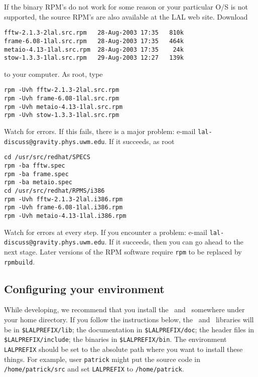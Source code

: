 If the binary RPM's do not work for some reason or your particular O/S
is not supported,   the source RPM's are also available at the LAL web
site.   Download
\begin{verbatim}
fftw-2.1.3-2lal.src.rpm   28-Aug-2003 17:35   810k  
frame-6.08-1lal.src.rpm   28-Aug-2003 17:35   464k  
metaio-4.13-1lal.src.rpm  28-Aug-2003 17:35    24k  
stow-1.3.3-1lal.src.rpm   29-Aug-2003 12:27   139k 
\end{verbatim}
to your computer.  As root,   type
\begin{verbatim}
rpm -Uvh fftw-2.1.3-2lal.src.rpm
rpm -Uvh frame-6.08-1lal.src.rpm
rpm -Uvh metaio-4.13-1lal.src.rpm
rpm -Uvh stow-1.3.3-1lal.src.rpm
\end{verbatim}
Watch for errors.  If this fails,  there is a major problem:  e-mail
\verb+lal-discuss@gravity.phys.uwm.edu+.    If it succeeds,  as root
\begin{verbatim}
cd /usr/src/redhat/SPECS
rpm -ba fftw.spec
rpm -ba frame.spec
rpm -ba metaio.spec
cd /usr/src/redhat/RPMS/i386
rpm -Uvh fftw-2.1.3-2lal.i386.rpm
rpm -Uvh frame-6.08-1lal.i386.rpm
rpm -Uvh metaio-4.13-1lal.i386.rpm
\end{verbatim}
Watch for errors at every step.  If you encounter a problem:   e-mail
\verb+lal-discuss@gravity.phys.uwm.edu+.   If it succeeds,  then you
can go ahead to the next stage.   Later versions of the RPM software
require \verb+rpm+ to be replaced by \verb+rpmbuild+. 

\color{black}
\subsection{Configuring your environment}
\color{black}

While developing,  we recommend that you install the \lal\ and \lalapps\
somewhere under your home directory.  If you follow the
instructions below,  the \lal\ and \lalapps\ libraries will be in
\verb+$LALPREFIX/lib+;  the documentation in \verb+$LALPREFIX/doc+; the header
files in \verb+$LALPREFIX/include+; the binaries in \verb+$LALPREFIX/bin+.
The environment \verb+LALPREFIX+ should be set to the absolute path where you
want to install these things.  For example,  user \texttt{patrick} might put
the source code in \verb+/home/patrick/src+ and set \verb+LALPREFIX+ to
\verb+/home/patrick+.


